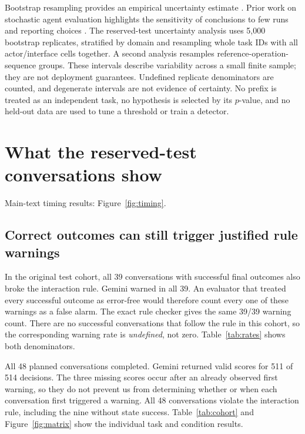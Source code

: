 Bootstrap resampling provides an empirical uncertainty estimate \citep{efron1979bootstrap}. Prior work on stochastic agent evaluation highlights the sensitivity of conclusions to few runs and reporting choices \citep{henderson2018matters,agarwal2021precipice}. The reserved-test uncertainty analysis uses 5,000 bootstrap replicates, stratified by domain and resampling whole task IDs with all actor/interface cells together. A second analysis resamples reference-operation-sequence groups. These intervals describe variability across a small finite sample; they are not deployment guarantees. Undefined replicate denominators are counted, and degenerate intervals are not evidence of certainty. No prefix is treated as an independent task, no hypothesis is selected by its $p$-value, and no held-out data are used to tune a threshold or train a detector.

\section{What the reserved-test conversations show}
Main-text timing results: Figure~\ref{fig:timing}.

\label{sec:results}
\subsection{Correct outcomes can still trigger justified rule warnings}
In the original test cohort, all 39 conversations with successful final outcomes also broke the interaction rule. Gemini warned in all 39. An evaluator that treated every successful outcome as error-free would therefore count every one of these warnings as a false alarm. The exact rule checker gives the same 39/39 warning count. There are no successful conversations that follow the rule in this cohort, so the corresponding warning rate is \emph{undefined}, not zero. Table~\ref{tab:rates} shows both denominators.

All 48 planned conversations completed. Gemini returned valid scores for 511 of 514 decisions. The three missing scores occur after an already observed first warning, so they do not prevent us from determining whether or when each conversation first triggered a warning. All 48 conversations violate the interaction rule, including the nine without state success. Table~\ref{tab:cohort} and Figure~\ref{fig:matrix} show the individual task and condition results.

